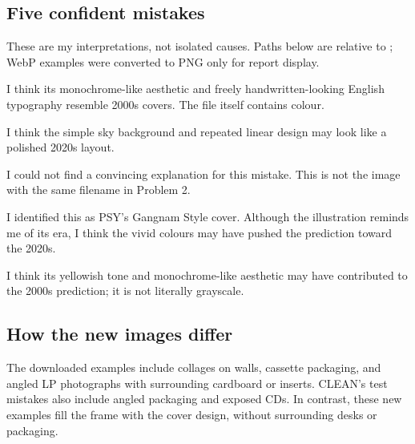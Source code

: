 \documentclass[11pt]{article}
\begin{document}
\subsection*{Five confident mistakes}
These are my interpretations, not isolated causes. Paths below are relative to ; WebP examples were converted to PNG only for report display.
\begin{center}\end{center}
I think its monochrome-like aesthetic and freely handwritten-looking English typography resemble 2000s covers. The file itself contains colour.
\begin{center}\end{center}
I think the simple sky background and repeated linear design may look like a polished 2020s layout.
\begin{center}\end{center}
I could not find a convincing explanation for this mistake. This is not the image with the same filename in Problem 2.
\begin{center}\end{center}
I identified this as PSY's Gangnam Style cover. Although the illustration reminds me of its era, I think the vivid colours may have pushed the prediction toward the 2020s.
\begin{center}\end{center}
I think its yellowish tone and monochrome-like aesthetic may have contributed to the 2000s prediction; it is not literally grayscale.

\subsection*{How the new images differ}
The downloaded examples include collages on walls, cassette packaging, and angled LP photographs with surrounding cardboard or inserts. CLEAN's test mistakes also include angled packaging and exposed CDs. In contrast, these new examples fill the frame with the cover design, without surrounding desks or packaging.
\end{document}
